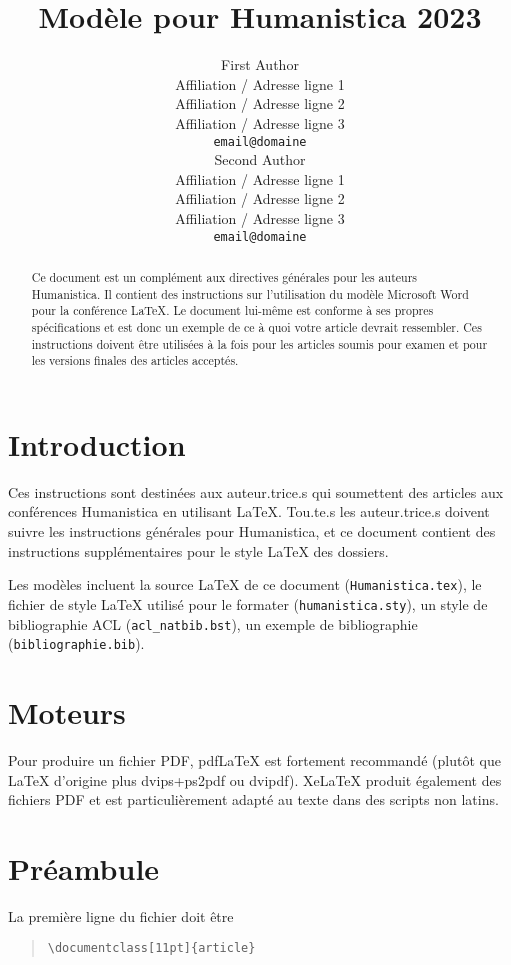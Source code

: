\documentclass[11pt,french]{article}
\title{Modèle pour Humanistica 2023}
\author{First Author \\
  Affiliation / Adresse ligne 1 \\
  Affiliation / Adresse ligne 2 \\
  Affiliation / Adresse ligne 3 \\
  \texttt{email@domaine} \\\And
  Second Author \\
  Affiliation / Adresse ligne 1 \\
  Affiliation / Adresse ligne 2 \\
  Affiliation / Adresse ligne 3 \\
  \texttt{email@domaine} \\}
\begin{document}
\maketitle
\begin{abstract}
Ce document est un complément aux directives générales pour les auteurs Humanistica. Il contient des instructions sur l'utilisation du modèle Microsoft Word pour la conférence \LaTeX{}. Le document lui-même est conforme à ses propres spécifications et est donc un exemple de ce à quoi votre article devrait ressembler. Ces instructions doivent être utilisées à la fois pour les articles soumis pour examen et pour les versions finales des articles acceptés.
\end{abstract}

\section{Introduction}

Ces instructions sont destinées aux auteur.trice.s qui soumettent des articles aux conférences Humanistica en utilisant \LaTeX. Tou.te.s les auteur.trice.s doivent suivre les instructions générales pour Humanistica, et ce document contient des instructions supplémentaires pour le style \LaTeX{} des dossiers.

Les modèles incluent la source \LaTeX{} de ce document (\texttt{Humanistica.tex}), le fichier de style \LaTeX{} utilisé pour le formater (\texttt{humanistica.sty}),
un style de bibliographie ACL (\texttt{acl\_natbib.bst}),
un exemple de bibliographie (\texttt{bibliographie.bib}).

\section{Moteurs}
Pour produire un fichier PDF, pdf\LaTeX{} est fortement recommandé (plutôt que \LaTeX{} d'origine plus dvips+ps2pdf ou dvipdf). Xe\LaTeX{} produit également des fichiers PDF et est particulièrement adapté au texte dans des scripts non latins.

\section{Préambule}

La première ligne du fichier doit être
\begin{quote}
\begin{verbatim}
\documentclass[11pt]{article}
\end{verbatim}
\end{quote}
\end{document}
